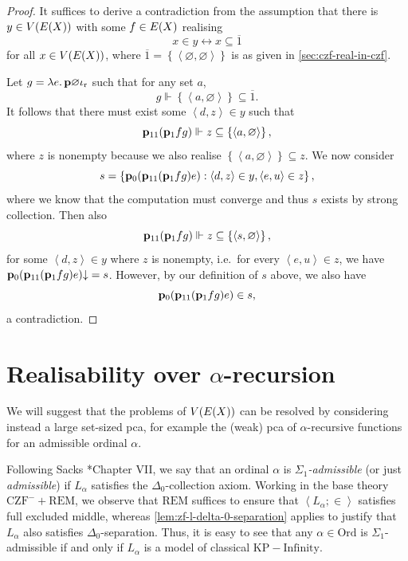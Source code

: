 \documentclass[12pt,openany]{book}
\theoremstyle{plain}
\theoremstyle{definition}
\newcommand\tuple[1]{\left\langle #1 \right\rangle}
\newcommand\oplam[1]{\mathop{\lambda #1.}}
\newcommand\KP{\mathrm{KP}}
\newcommand\CZF{\mathrm{CZF}}
\newcommand\REM{\mathrm{REM}}
\newcommand\Ord{\mathrm{Ord}}
\newcommand\bp{\mathbf{p}}
\newcommand\ior{\iota_\textup{r}}
\begin{document}
\begin{proof}
  It suffices to derive a contradiction from the assumption that there is $y \in V\mleft(E\mleft(X\mright)\mright)$ with some $f \in E\mleft(X\mright)$ realising
  \[x \in y \leftrightarrow x \subseteq \overline{1}\]
  for all $x \in V\mleft(E\mleft(X\mright)\mright)$, where $\overline{1} = \left\{\tuple{\varnothing, \varnothing}\right\}$ is as given in \autoref{sec:czf-real-in-czf}.

  Let $g = \oplam{e} \bp \varnothing \ior$ such that for any set $a$,
  \[g \Vdash \left\{\tuple{a, \varnothing}\right\} \subseteq \overline{1}.\]
  It follows that there must exist some $\tuple{d, z} \in y$ such that
  \[\bp_{11} \mleft(\bp_1 fg\mright) \Vdash z \subseteq \left\{\tuple{a, \varnothing}\right\},\]
  where $z$ is nonempty because we also realise $\left\{\tuple{a, \varnothing}\right\} \subseteq z$. We now consider
  \[s = \left\{\bp_0 \mleft(\bp_{11} \mleft(\bp_1 fg\mright) e\mright) : \tuple{d, z} \in y, \tuple{e, u} \in z\right\},\]
  where we know that the computation must converge and thus $s$ exists by strong collection. Then also
  \[\bp_{11} \mleft(\bp_1 fg\mright) \Vdash z \subseteq \left\{\tuple{s, \varnothing}\right\},\]
  for some $\tuple{d, z} \in y$ where $z$ is nonempty, i.e.\ for every $\tuple{e, u} \in z$, we have $\bp_0 \mleft(\bp_{11} \mleft(\bp_1 fg\mright) e\mright) {\downarrow} = s$. However, by our definition of $s$ above, we also have
  \[\bp_0 \mleft(\bp_{11} \mleft(\bp_1 fg\mright) e\mright) \in s,\]
  a contradiction.
\end{proof}

\section{Realisability over \texorpdfstring{$\alpha$}{\textalpha}-recursion}

We will suggest that the problems of $V\mleft(E\mleft(X\mright)\mright)$ can be resolved by considering instead a large set-sized pca, for example the (weak) pca of $\alpha$-recursive functions for an admissible ordinal $\alpha$.

Following Sacks \cite{sacks90-higher-recursion}*{Chapter VII}, we say that an ordinal $\alpha$ is \emph{$\Sigma_1$-admissible} (or just \emph{admissible}) if $L_\alpha$ satisfies the $\Delta_0$-collection axiom. Working in the base theory $\CZF^- + \REM$, we observe that $\REM$ suffices to ensure that $\tuple{L_\alpha; \in}$ satisfies full excluded middle, whereas \autoref{lem:zf-l-delta-0-separation} applies to justify that $L_\alpha$ also satisfies $\Delta_0$-separation. Thus, it is easy to see that any $\alpha \in \Ord$ is $\Sigma_1$-admissible if and only if $L_\alpha$ is a model of classical $\KP - \text{Infinity}$.
\end{document}
